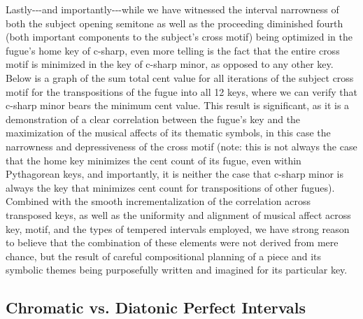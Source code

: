 Lastly-\/-\/-and importantly-\/-\/-while we have witnessed the interval
narrowness of both the subject opening semitone as well as the
proceeding diminished fourth (both important components to the subject's
cross motif) being optimized in the fugue's home key of c-sharp, even
more telling is the fact that the entire cross motif is minimized in the
key of c-sharp minor, as opposed to any other key. Below is a graph of
the sum total cent value for all iterations of the subject cross motif
for the transpositions of the fugue into all 12 keys, where we can
verify that c-sharp minor bears the minimum cent value. This result is
significant, as it is a demonstration of a clear correlation between the
fugue's key and the maximization of the musical affects of its thematic
symbols, in this case the narrowness and depressiveness of the cross
motif (note: this is not always the case that the home key minimizes the
cent count of its fugue, even within Pythagorean keys, and importantly,
it is neither the case that c-sharp minor is always the key that
minimizes cent count for transpositions of other fugues). Combined with
the smooth incrementalization of the correlation across transposed keys,
as well as the uniformity and alignment of musical affect across key,
motif, and the types of tempered intervals employed, we have strong
reason to believe that the combination of these elements were not
derived from mere chance, but the result of careful compositional
planning of a piece and its symbolic themes being purposefully written
and imagined for its particular key.



    \begin{center}
    \end{center}
    
    \subsection{Chromatic vs. Diatonic Perfect
Intervals}\label{chromatic-vs.-diatonic-perfect-intervals}

